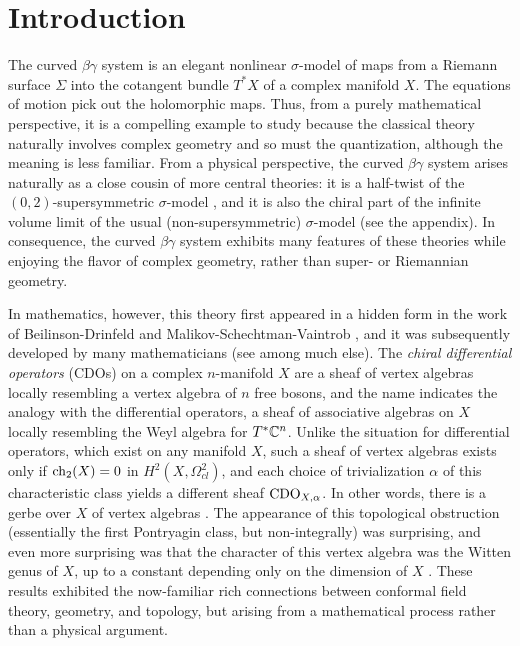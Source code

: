 \part*{Introduction}


The curved $\beta\gamma$ system is an elegant nonlinear $\sigma$-model of maps from a Riemann surface $\Sigma$ into the cotangent bundle $T^*X$ of a complex manifold $X$. The equations of motion pick out the holomorphic maps. Thus, from a purely mathematical perspective, it is a compelling example to study 
because the classical theory naturally involves complex geometry and so must the quantization, although the meaning is less familiar. From a physical perspective, the curved $\beta\gamma$ system arises naturally as a close cousin of more central theories: it is a half-twist of the $(0,2)$-supersymmetric $\sigma$-model \cite{WittenCDO}, and it is also the chiral part of the infinite volume limit of the usual (non-supersymmetric) $\sigma$-model (see the appendix). In consequence, the curved $\beta\gamma$ system exhibits many features of these theories while enjoying the flavor of complex geometry, rather than super- or Riemannian geometry.

In mathematics, however, this theory first appeared in a hidden form in the work of Beilinson-Drinfeld and Malikov-Schechtman-Vaintrob \cite{BD,MSV}, and it was subsequently developed by many mathematicians (see \cite{KV,Cheung,Bressler} among much else). The {\em chiral differential operators} (CDOs) on a complex $n$-manifold $X$ are a sheaf of vertex algebras locally resembling a vertex algebra of $n$ free bosons, and the name indicates the analogy with the differential operators, a sheaf of associative algebras on $X$ locally resembling the Weyl algebra for $T^*\mathbb C^n$. Unlike the situation for differential operators, which exist on any manifold $X$, such a sheaf of vertex algebras exists only if ${\rm ch}_2(X) = 0$ in $H^2(X, \Omega^2_{cl})$, and each choice of trivialization $\alpha$ of this characteristic class yields a different sheaf ${\rm CDO}_{X,\alpha}$. In other words, there is a gerbe over $X$ of vertex algebras \cite{GMS}. The appearance of this topological obstruction (essentially the first Pontryagin class, but non-integrally) was surprising, and even more surprising was that the character of this vertex algebra was the Witten genus of $X$, up to a constant depending only on the dimension of $X$ \cite{BorLib}. These results exhibited the now-familiar rich connections between conformal field theory, geometry, and topology, but arising from a mathematical process rather than a physical argument. 

